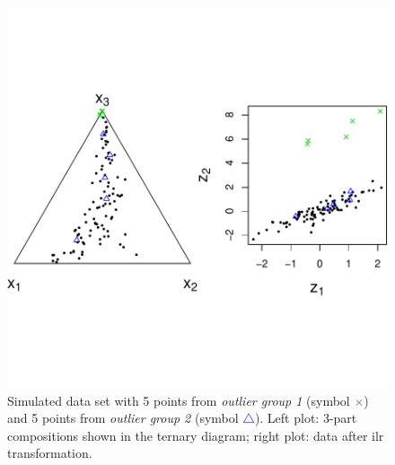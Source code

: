 \documentclass{scrartcl}\usepackage[]{graphicx}\usepackage[]{color}
\begin{document}



 







\begin{figure}[h]
\begin{center}
\vspace*{-3cm}
\includegraphics{plot-acomp}  
\vspace*{-33mm}
\caption{Simulated data set with 5 points from
\textit{outlier group 1} (symbol \textcolor{green}{$\times$}) 
and 5 points from \textit{outlier group 2} 
(symbol \textcolor{blue}{$\triangle$}).
Left plot: 3-part compositions shown in the ternary diagram;
right plot: data after ilr transformation.}
\label{repFig1}
\end{center}
\end{figure}
\end{document}

